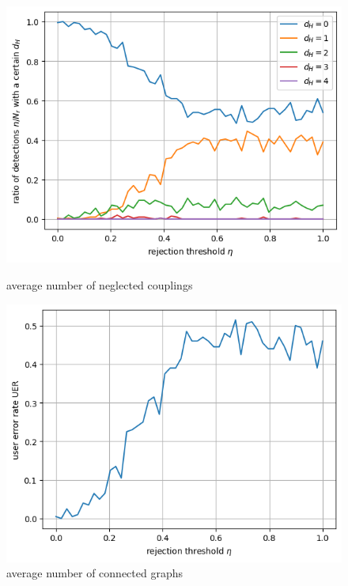\documentclass{article}
\begin{document}
	\begin{figure}[h]
		\begin{minipage}{0.49\textwidth}
			\centering
			\includegraphics[width=\textwidth]{img/hamming_rule_1.png}
			\caption{average number of neglected couplings}
			\label{fig:hamming rule 1}
		\end{minipage}
		\begin{minipage}{0.49\textwidth}
			\centering
			\includegraphics[width=\textwidth]{img/uer_rule_1.png}
			\caption{average number of connected graphs}
			\label{fig:uer rule 1}
		\end{minipage}	
	\end{figure}
\end{document}
